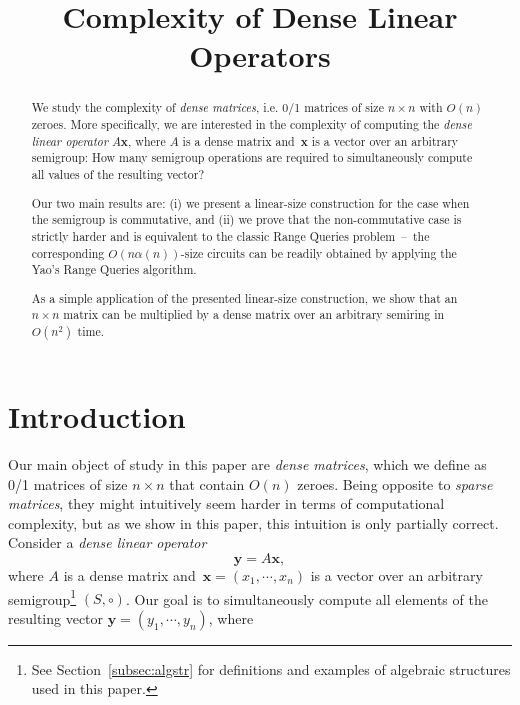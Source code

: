 \documentclass[11pt,letterpaper]{article}
\begin{document}
\listoftodos

\sloppy
\author{}
\date{}
\title{Complexity of Dense Linear Operators}
\maketitle

\begin{abstract}
We study the complexity of \emph{dense matrices}, i.e. 0/1 matrices of size
$n \times n$ with $O(n)$ zeroes. More specifically, we are interested in
the complexity of computing the \emph{dense linear operator} $A\mathbf{x}$,
where $A$ is a dense matrix and~$\mathbf{x}$ is a vector over an arbitrary
semigroup: How many semigroup operations are required to simultaneously compute
all values of the resulting vector?

Our two main results are: (i) we present a linear-size construction for the case
when the semigroup is commutative, and (ii) we prove that the non-commutative
case is strictly harder and is equivalent to the classic Range Queries
problem~--~the corresponding $O(n\alpha(n))$-size circuits can be readily
obtained by applying the Yao's Range Queries algorithm.

As a simple application of the presented linear-size construction, we show that
an $n\times n$ matrix can be multiplied by a dense matrix over an arbitrary
semiring in $O(n^2)$ time.
\end{abstract}


\section{Introduction}

Our main object of study in this paper are \emph{dense matrices}, which we
define as 0/1 matrices of size $n \times n$ that contain $O(n)$ zeroes. Being
opposite to \emph{sparse matrices}, they might intuitively seem harder in terms
of computational complexity, but as we show in this paper, this intuition is
only partially correct. Consider a \emph{dense linear operator}
\[
\mathbf{y} = A\mathbf{x},
\]
where $A$ is a dense matrix and~$\mathbf{x}=(x_1, \cdots, x_n)$ is a vector over
an arbitrary semigroup\footnote{See Section~\ref{subsec:algstr} for definitions
and examples of algebraic structures used in this paper.} $(S, \circ)$. Our goal
is to simultaneously compute all elements of the resulting vector
$\mathbf{y}=(y_1, \cdots, y_n)$, where
\end{document}
